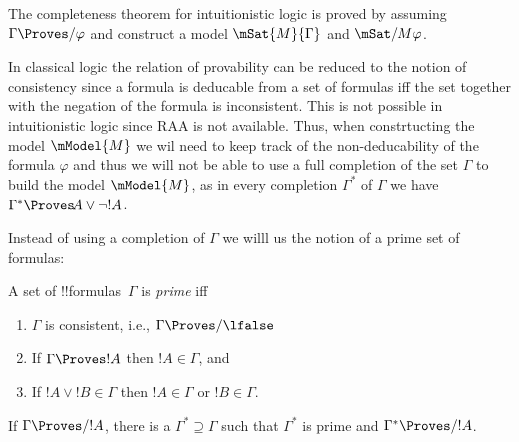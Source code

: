 \documentclass[../../../include/open-logic-section]{subfiles}
\begin{document}


The completeness theorem for intuitionistic logic is proved by assuming $\Gamma \Proves/ \varphi$ and construct a model $\mSat{M}{\Gamma}$ and $\mSat/{M}{\varphi}$.

In classical logic the relation of provability can be reduced to the notion of consistency since a formula is deducable from a set of formulas iff the set together with the negation of the formula is inconsistent. This is not possible in intuitionistic logic since RAA is not available. Thus, when constrtucting the model $\mModel{M}$ we wil need to keep track of the non-deducability of the formula $\varphi$ and thus we will not be able to use a full completion of the set $\Gamma$ to build the model $\mModel{M}$, as in every completion $\Gamma^*$ of $\Gamma$ we have $\Gamma^* \Proves \!A \lor \lnot !A$.

Instead of using a completion of $\Gamma$ we willl us the notion of a prime set of formulas:

\begin{defn}
  A set of !!{formula}s~$\Gamma$ is \emph{prime} iff 
  \begin{enumerate}
  \item{} $\Gamma$ is consistent, i.e., $\Gamma \Proves/ \lfalse$
  \item{} If $\Gamma \Proves !A$ then $!A \in \Gamma$, and
  \item{} If $!A \lor !B \in \Gamma$ then $!A \in
    \Gamma$ or $!B \in \Gamma$.
  \end{enumerate}
\end{defn}

\begin{lem}
   If $\Gamma \Proves/ !A$, there is a
  $\Gamma^* \supseteq \Gamma$ such that $\Gamma^*$ is prime and
  $\Gamma^* \Proves/ !A$.
\end{lem}
\end{document}
